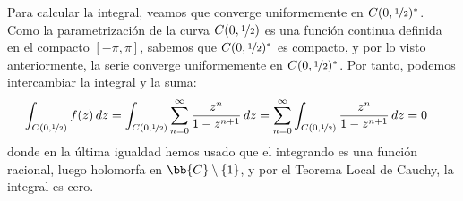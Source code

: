 \documentclass[12pt]{article}
\begin{document}
\begin{ejercicio}[3.5 puntos]
        Para calcular la integral, veamos que converge uniformemente en $C(0, \nicefrac{1}{2})^*$. Como la parametrización de la curva $C(0, \nicefrac{1}{2})$ es una función continua definida en el compacto $[-\pi,\pi]$, sabemos que $C(0, \nicefrac{1}{2})^*$ es compacto, y por lo visto anteriormente, la serie converge uniformemente en $C(0, \nicefrac{1}{2})^*$. Por tanto, podemos intercambiar la integral y la suma:
        \begin{align*}
            \int_{C(0, \nicefrac{1}{2})} f(z) \, dz &= \int_{C(0, \nicefrac{1}{2})} \sum_{n=0}^{\infty} \dfrac{z^n}{1-z^{n+1}} \, dz = \sum_{n=0}^{\infty} \int_{C(0, \nicefrac{1}{2})} \dfrac{z^n}{1-z^{n+1}} \, dz = 0
        \end{align*}
        donde en la última igualdad hemos usado que el integrando es una función racional, luego holomorfa en $\bb{C}\setminus \{1\}$, y por el Teorema Local de Cauchy, la integral es cero.
    \end{ejercicio}
\end{document}

